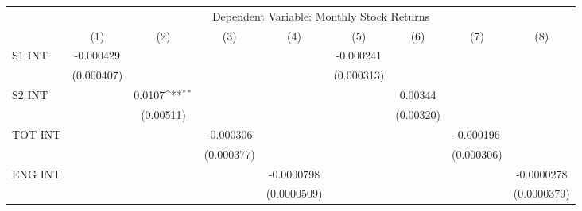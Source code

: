 {
\def\sym#1{\ifmmode^{#1}\else\(^{#1}\)\fi}
\begin{tabular}{l*{8}{c}}
\hline\hline
                    &\multicolumn{8}{c}{Dependent Variable: Monthly Stock Returns}                                                                                                                  \\\cmidrule(lr){2-9}
                    &\multicolumn{1}{c}{(1)}         &\multicolumn{1}{c}{(2)}         &\multicolumn{1}{c}{(3)}         &\multicolumn{1}{c}{(4)}         &\multicolumn{1}{c}{(5)}         &\multicolumn{1}{c}{(6)}         &\multicolumn{1}{c}{(7)}         &\multicolumn{1}{c}{(8)}         \\
\hline
S1 INT              &   -0.000429         &                     &                     &                     &   -0.000241         &                     &                     &                     \\
                    &  (0.000407)         &                     &                     &                     &  (0.000313)         &                     &                     &                     \\
S2 INT              &                     &      0.0107\sym{**} &                     &                     &                     &     0.00344         &                     &                     \\
                    &                     &   (0.00511)         &                     &                     &                     &   (0.00320)         &                     &                     \\
TOT INT             &                     &                     &   -0.000306         &                     &                     &                     &   -0.000196         &                     \\
                    &                     &                     &  (0.000377)         &                     &                     &                     &  (0.000306)         &                     \\
ENG INT             &                     &                     &                     &  -0.0000798         &                     &                     &                     &  -0.0000278         \\
                    &                     &                     &                     & (0.0000509)         &                     &                     &                     & (0.0000379)         \\

\end{tabular}}
